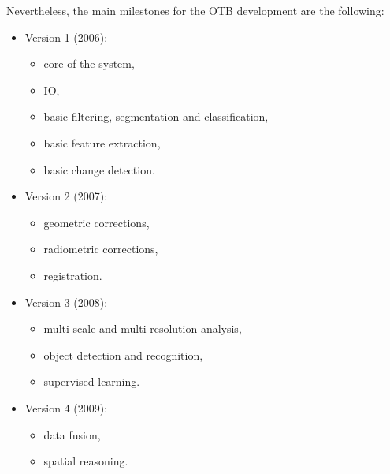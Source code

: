 Nevertheless, the main milestones for the OTB development are the
following:
\begin{itemize}
  \item{Version 1 (2006):}
    \begin{itemize}
    \item core of the system,
    \item IO,
    \item basic filtering, segmentation and classification,
    \item basic feature extraction,
    \item basic change detection.
    \end{itemize}
    \item{Version 2 (2007):}
      \begin{itemize}
      \item geometric corrections,
      \item radiometric corrections,
      \item registration.
      \end{itemize}
    \item{Version 3 (2008):}
      \begin{itemize}
      \item multi-scale and multi-resolution analysis,
      \item object detection and recognition,
      \item supervised learning.
      \end{itemize}
    \item{Version 4 (2009):}
      \begin{itemize}
	\item data fusion,
	\item spatial reasoning.
      \end{itemize}
    
\end{itemize}

